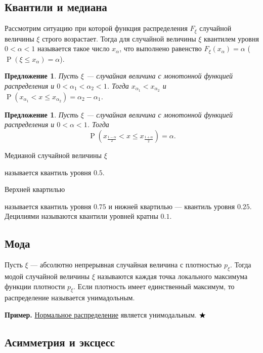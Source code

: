 \documentclass[12pt]{article}
\newtheorem{proposition}[theorem]{Предложение}
\numberwithin{theorem}{section}
\theoremstyle{definition}
\newenvironment{example}{\indent \textbf{Пример.}}{$ \hfill \bigstar $}
\newcommand{\defin}[2]{\hypertarget{#2}{{\color{red} #1}}}
\newcommand{\prob}{\operatorname{P}}
\begin{document}
	\subsection{Квантили и медиана}
	
	Рассмотрим ситуацию при которой функция распределения $ F_\xi $ случайной величины $ \xi $
	строго возрастает. 
	Тогда для случайной величины $ \xi $ \defin{квантилем уровня $ 0 < \alpha < 1 $}{quantile}
	называется такое число $ x_{\alpha} $, что выполнено равенство $ F_\xi(x_{\alpha}) = \alpha $
	($ \prob(\xi \leqslant x_{\alpha}) = \alpha $).
	
	\begin{proposition}
		Пусть $ \xi $ --- случайная величина с монотонной функцией распределения 
		и $ 0 < \alpha_1 < \alpha_2 < 1 $.
		Тогда $ x_{\alpha_1} < x_{\alpha_2} $ и $ \prob(x_{\alpha_1} < x \leqslant x_{\alpha_2}) 
		= \alpha_2 - \alpha_1 $.
	\end{proposition}
	
	\begin{proposition}
		Пусть $ \xi $ --- случайная величина с монотонной функцией распределения
		и $ 0 < \alpha < 1 $. Тогда 
		$$ \prob\left(x_{\tfrac{1 - \alpha}{2}} < x \leqslant x_{\tfrac{1 + \alpha}{2}}\right) = \alpha. $$
	\end{proposition}
	
	\defin{Медианой случайной величины $ \xi $}{med} называется квантиль уровня $ 0.5 $. 

	\defin{Верхней квартилью}{} называется квантиль уровня $ 0.75 $ и \defin{нижней квартилью}{} --- квантиль уровня $ 0.25 $.
	\defin{Децилиями}{} называются квантили уровней кратны $ 0.1 $.

	\subsection{Мода}
	
	Пусть $ \xi $ --- абсолютно непрерывная случайная величина с плотностью $ p_\xi $.
	Тогда \defin{модой}{mode} случайной величины $ \xi $ называются каждая точка локального максимума функции плотности $ p_\xi $.
	Если плотность имеет единственный максимум, то распределение называется \defin{унимадольным}{unimodal}.
	
	\begin{example}
		\hyperlink{normal-distribution}{Нормальное распределение} является унимодальным.
	\end{example}
	
	\subsection{Асимметрия и эксцесс}
	
\end{document}
